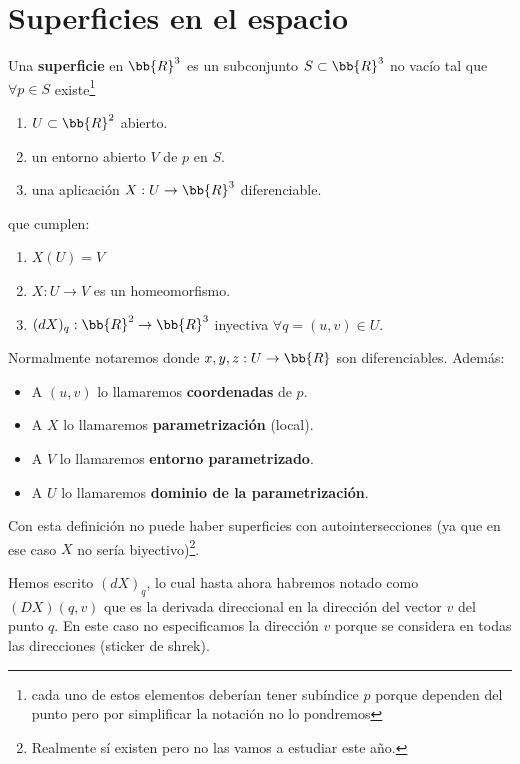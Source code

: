 \chapter{Superficies en el espacio}

\begin{definicion}
    Una \textbf{superficie} en $\bb{R}^3$ es un subconjunto $S\subset \bb{R}^3$ no vacío tal que $\forall p \in S$ existe\footnote{cada uno de estos elementos deberían tener subíndice $p$ porque dependen del punto pero por simplificar la notación no lo pondremos}
    \begin{enumerate}
        \item $U\subset \bb{R}^2$ abierto.
        \item un entorno abierto $V$ de $p$ en $S$.
        \item una aplicación $X:U \to \bb{R}^3$ diferenciable.
    \end{enumerate}
    que cumplen:
    \begin{enumerate}
        \item $X(U)=V$
        \item $X:U\to V$ es un homeomorfismo.
        \item $(dX)_q : \bb{R}^2 \to \bb{R}^3$ inyectiva $\forall q=(u,v) \in U$.
    \end{enumerate}
    Normalmente notaremos
    donde $x,y,z:U\to \bb{R}$ son diferenciables. Además:
    \begin{itemize}  
            \item A $(u,v)$ lo llamaremos \textbf{coordenadas} de $p$.
            \item A $X$ lo llamaremos \textbf{parametrización} (local).
            \item A $V$ lo llamaremos \textbf{entorno parametrizado}.
            \item A $U$ lo llamaremos \textbf{dominio de la parametrización}.
        \end{itemize}
\end{definicion}

\begin{observacion}
    Con esta definición no puede haber superficies con autointersecciones (ya que en ese caso $X$ no sería biyectivo)\footnote{Realmente sí existen pero no las vamos a estudiar este año.}.
\end{observacion}

\begin{notacion}
    Hemos escrito $(dX)_q$, lo cual hasta ahora habremos notado como $(DX)(q,v)$ que es la derivada direccional en la dirección del vector $v$ del punto $q$. En este caso no especificamos la dirección $v$ porque se considera en todas las direcciones (sticker de shrek).
\end{notacion}

